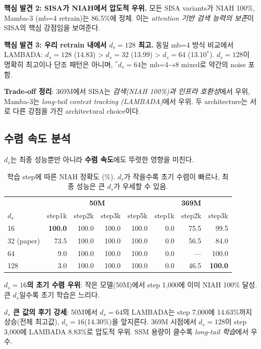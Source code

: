 \documentclass[11pt]{article}
\begin{document}
\textbf{핵심 발견 2: SISA가 NIAH에서 압도적 우위.} 모든 SISA variants가 NIAH 100\%, Mamba-3 (mb=4 retrain)는 86.5\%에 정체. 이는 \textit{attention 기반 검색 능력의 보존}이 SISA의 핵심 강점임을 보여준다.

\textbf{핵심 발견 3: 우리 retrain 내에서 $d_s = 128$ 최고.} 동일 mb=4 방식 비교에서 LAMBADA: $d_s=128$ (14.83) > $d_s=32$ (13.99) > $d_s=64$ (13.10$^*$). $d_s=128$이 명확히 최고이나 단조 패턴은 아니며, $^*$$d_s = 64$는 mb=4→8 mixed로 약간의 noise 포함.

\textbf{Trade-off 정리}: 369M에서 SISA는 \textit{검색(NIAH 100\%)과 인프라 호환성}에서 우위, Mamba-3는 \textit{long-tail context tracking (LAMBADA)}에서 우위. 두 architecture는 서로 다른 강점을 가진 architectural choice이다.

\subsection{수렴 속도 분석}
\label{sec:convergence}

$d_s$는 최종 성능뿐만 아니라 \textbf{수렴 속도}에도 뚜렷한 영향을 미친다.

\begin{table}[h]
\centering\small
\caption{학습 step에 따른 NIAH 정확도 (\%). $d_s$가 작을수록 초기 수렴이 빠르나, 최종 성능은 큰 $d_s$가 우세할 수 있음.}
\label{tab:niah_convergence}
\begin{tabular}{l|rrrr|rrr}
\toprule
 & \multicolumn{4}{c|}{\textbf{50M}} & \multicolumn{3}{c}{\textbf{369M}} \\
$d_s$ & step1k & step2k & step3k & step5k & step1k & step2k & step3k \\
\midrule
16 & \textbf{100.0} & 100.0 & 100.0 & 100.0 & 0.0 & 75.5 & 99.5 \\
32 (paper) & 73.5 & 100.0 & 100.0 & 100.0 & 0.0 & 56.5 & 84.0 \\
64 & 9.0 & 100.0 & 100.0 & 100.0 & 0.0 & --- & 100.0 \\
128 & 3.0 & 100.0 & 100.0 & 100.0 & 0.0 & 46.5 & \textbf{100.0} \\
\bottomrule
\end{tabular}
\end{table}

\textbf{$d_s = 16$의 초기 수렴 우위}: 작은 모델(50M)에서 step 1,000에 이미 NIAH 100\% 달성. 큰 $d_s$일수록 초기 학습은 느리다.

\textbf{$d_s$ 큰 값의 후기 강세}: 50M에서 $d_s = 64$의 LAMBADA는 step 7,000에 14.63\%까지 상승(전체 최고값), $d_s = 16$(14.30\%)을 앞지른다. 369M 시점에서 $d_s = 128$이 step 3,000에 LAMBADA 8.83\%로 압도적 우위. SSM 용량이 클수록 \textit{long-tail 학습}에서 우수.
\end{document}
